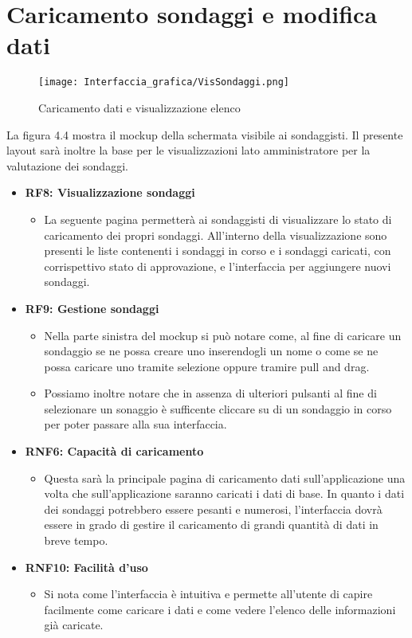 \section{Caricamento sondaggi e modifica dati}
    \label{fig:4.4}
    \begin{figure}[H]
        \center
        \texttt{[image: Interfaccia\_grafica/VisSondaggi.png]}
        \caption{Caricamento dati e visualizzazione elenco}
    \end{figure} 
    La figura 4.4 mostra il mockup della schermata visibile ai sondaggisti.\newline
    Il presente layout sarà inoltre la base per le visualizzazioni lato amministratore per la valutazione dei sondaggi.
    \begin{itemize}
        \item \textbf{RF8: Visualizzazione sondaggi} \begin{itemize}
            \item La seguente pagina permetterà ai sondaggisti di visualizzare lo stato di caricamento dei propri sondaggi. All'interno della visualizzazione sono presenti le liste contenenti i sondaggi in corso e i sondaggi caricati, con corrispettivo stato di approvazione, e l'interfaccia per aggiungere nuovi sondaggi.
        \end{itemize}
        \item \textbf{RF9: Gestione sondaggi} \begin{itemize}
            \item Nella parte sinistra del mockup si può notare come, al fine di caricare un sondaggio se ne possa creare uno inserendogli un nome o come se ne possa caricare uno tramite selezione oppure tramire pull and drag.
            \item Possiamo inoltre notare che in assenza di ulteriori pulsanti al fine di selezionare un sonaggio è sufficente cliccare su di un sondaggio in corso per poter passare alla sua interfaccia.
        \end{itemize}
        \item \textbf{RNF6: Capacità di caricamento} \begin{itemize}
            \item Questa sarà la principale pagina di caricamento dati sull'applicazione una volta che sull'applicazione saranno caricati i dati di base. In quanto i dati dei sondaggi potrebbero essere pesanti e numerosi, l'interfaccia dovrà essere in grado di gestire il caricamento di grandi quantità di dati in breve tempo.
        \end{itemize}
        \item \textbf{RNF10: Facilità d'uso} \begin{itemize}
            \item Si nota come l'interfaccia è intuitiva e permette all'utente di capire facilmente come caricare i dati e come vedere l'elenco delle informazioni già caricate.
        \end{itemize}
    \end{itemize}

